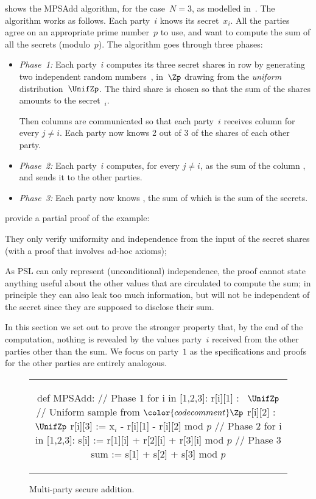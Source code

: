  shows the MPSAdd algorithm, for the case~$N=3$,
as modelled in~\cite{barthe2019probabilistic}.
The algorithm works as follows.
Each party~$i$ knows its secret~$x_i$.
All the parties agree on an appropriate prime number~$p$ to use,
and want to compute the sum of all the secrets (modulo~$p$).
The algorithm goes through three phases:
\begin{itemize}
  \item\emph{Phase~1:}
    Each party~$i$ computes its three secret shares in row 
    by generating two independent random
    numbers~,  in~$\Zp$
    drawing from the \emph{uniform} distribution~$\UnifZp$.
The third share  is chosen so that the sum of the shares
    amounts to the secret~$_i$.

    Then columns are communicated so that each party~$i$
    receives column  for every $j\ne i$.
    Each party now knows 2 out of 3 of the shares of each other party.
  \item\emph{Phase~2:}
    Each party~$i$
    computes, for every $j\ne i$,
     as the sum of the column ,
    and sends it to the other parties.
  \item\emph{Phase~3:}
    Each party now knows ,
    the sum of which is the sum of the secrets.
\end{itemize}

\citet{barthe2019probabilistic} provide a partial proof of the example:
\begin{enumerate*}
\item
  They only verify uniformity and independence from the input of the
  secret shares  (with a proof that involves ad-hoc axioms);
\item
  As PSL can only represent (unconditional) independence,
  the proof cannot state anything
  useful about the other values  that are circulated to compute the sum;
  in principle they can also leak too much information,
  but will not be independent of the secret since they are supposed to
  disclose their sum.
\end{enumerate*}

In this section we set out to prove the stronger property that,
by the end of the computation, nothing is revealed by the values
party~$i$ received from the other parties other than the sum.
We focus on party~$1$ as the specifications and proofs for the other parties
are entirely analogous.

\begin{figure}
  \centering \begin{tabular}{c}
  \begin{sourcecode}[gobble=2]
  def MPSAdd:
    // Phase 1
    for i in [1,2,3]:
      r[i][1] :~ $\UnifZp$ // Uniform sample from $\color{codecomment}\Zp$
      r[i][2] :~ $\UnifZp$
      r[i][3] := x$_i$ - r[i][1] - r[i][2] mod $p$
    // Phase 2
    for i in [1,2,3]:
      s[i] := r[1][i] + r[2][i] + r[3][i] mod $p$
    // Phase 3
    sum := s[1] + s[2] + s[3] mod $p$
  \end{sourcecode}\end{tabular}
  \caption{Multi-party secure addition.}
  \label{fig:mpsadd}
\end{figure}


